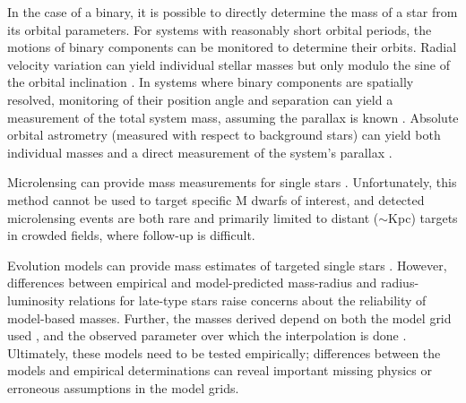\documentclass[twocolumn]{aastex62}
\begin{document}
In the case of a binary, it is possible to directly determine the mass of a star from its orbital parameters. For systems with reasonably short orbital periods, the motions of binary components can be monitored to determine their orbits. Radial velocity variation can yield individual stellar masses but only modulo the sine of the orbital inclination \citep[e.g.,][]{Torres2002,Kraus2011,Stevens:2018aa}. In systems where binary components are spatially resolved, monitoring of their position angle and separation can yield a measurement of the total system mass, assuming the parallax is known \citep[e.g.,][]{Soderhjelm1999,Woi2003,2009ApJ...699..168D}. Absolute orbital astrometry (measured with respect to background stars) can yield both individual masses and a direct measurement of the system's parallax \citep[e.g.,][]{Koh2012,Benedict2016}. 

Microlensing can provide mass measurements for single stars \citep[e.g.,][]{2016ApJ...825...60Z,2017ApJ...838..154C,2017AJ....154..176S}. Unfortunately, this method cannot be used to target specific M dwarfs of interest, and detected microlensing events are both rare and primarily limited to distant ($\sim$Kpc) targets in crowded fields, where follow-up is difficult. 

Evolution models can provide mass estimates of targeted single stars \citep[e.g.,][]{Muirhead2012a}. However, differences between empirical and model-predicted mass-radius and radius-luminosity relations for late-type stars \citep[e.g.,][]{Boyajian2012,Feiden2012a} raise concerns about the reliability of model-based masses. Further, the masses derived depend on both the model grid used \citep{Spada2013,MIST1}, and the observed parameter over which the interpolation is done \citep[e.g., color versus luminosity,][]{Mann:2012,Mann2015b}. Ultimately, these models need to be tested empirically; differences between the models and empirical determinations can reveal important missing physics or erroneous assumptions in the model grids. 
\end{document}
